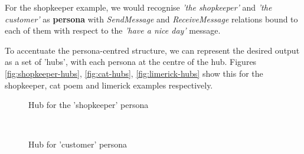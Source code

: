For the shopkeeper example, we would recognise \textit{'the shopkeeper'} and \textit{'the customer'} as \textbf{persona} with \textit{SendMessage} and \textit{ReceiveMessage} relations bound to each of them with respect to the \textit{'have a nice day'} message.

To accentuate the persona-centred structure, we can represent the desired output as a set of 'hubs', with each persona at the centre of the hub. Figures \ref{fig:shopkeeper-hubs}, \ref{fig:cat-hubs}, \ref{fig:limerick-hubs} show this for the shopkeeper, cat poem and limerick examples respectively. 

\begin{figure*}[t!]
    \centering
    \begin{subfigure}[t]{0.45\textwidth}
        \caption{Hub for the 'shopkeeper' persona}
    \end{subfigure}%
    ~ 
    \begin{subfigure}[t]{0.45\textwidth}
        \caption{Hub for 'customer' persona}
    \end{subfigure}
    \caption{Persona hubs diagram for shopkeeper example}
    \label{fig:shopkeeper-hubs}
\end{figure*}

